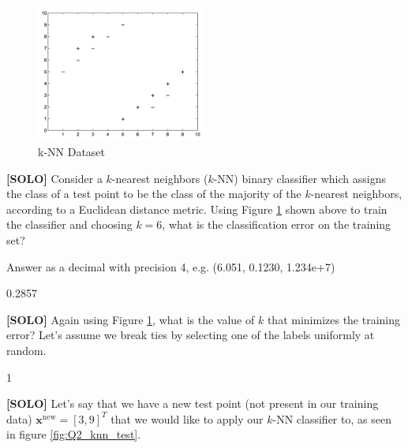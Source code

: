 \documentclass[11pt,addpoints,answers]{exam}
\newcommand{\xv}{\mathbf{x}}
\begin{document}
\begin{questions}
    
    \begin{figure}[H]
        \centering
        \includegraphics[width = 0.5\textwidth]{images/Q2_knn.png}
        \caption{k-NN Dataset \label{fig:Q2_knn}}
    \end{figure}

    \question[2] \textbf{[SOLO]} Consider a $k$-nearest neighbors ($k$-NN) binary classifier which assigns the class of a test point to be the class of the majority of the $k$-nearest neighbors, according to a Euclidean distance metric. Using Figure \ref{fig:Q2_knn} shown above to train the classifier and choosing $k=6$, what is the classification error on the training set?
    
    Answer as a decimal with precision 4, e.g. (6.051, 0.1230, 1.234e+7)
    
    \begin{your_solution}[title=Your answer:,height=2cm,width=5cm]
    0.2857
    \end{your_solution}
    
    
    
    

    
    
    \question[1] \textbf{[SOLO]} Again using Figure \ref{fig:Q2_knn}, what is the value of $k$ that minimizes the training error? Let’s assume we break ties by selecting one of the labels uniformly at random.
    
    \begin{your_solution}[title=Your answer:,height=2cm,width=5cm]
1    
    \end{your_solution}

    
    
    \clearpage
    
    \question[2] \textbf{[SOLO]} Let's say that we have a new test point (not present in our training data) $\xv^{\text{new}} = [3,9]^T$ that we would like to apply our $k$-NN classifier to, as seen in figure \ref{fig:Q2_knn_test}.
    

\end{questions}
\end{document}
